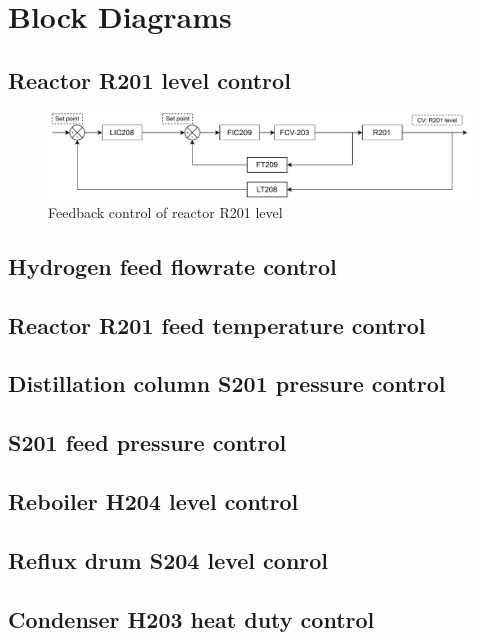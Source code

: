 \section{Block Diagrams}
\label{app:blockdiag}
\subsection{Reactor R201 level control}

\begin{figure}[H]
    \centering
    \includegraphics[width=\linewidth]{chapters/4-operation-control/4-Figures/R201-LC.pdf}
    \caption{Feedback control of reactor R201 level}
    \label{fig:R201-LC}
\end{figure} 

\subsection{Hydrogen feed flowrate control}

\subsection{Reactor R201 feed temperature control}

\subsection{Distillation column S201 pressure control}

\subsection{S201 feed pressure control}

\subsection{Reboiler H204 level control}

\subsection{Reflux drum S204 level conrol}

\subsection{Condenser H203 heat duty control}

